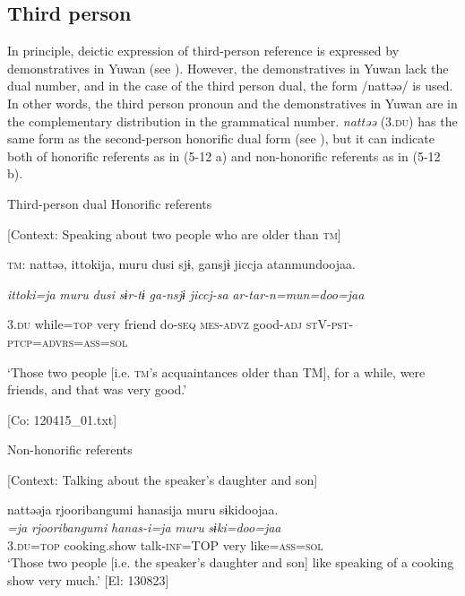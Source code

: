 \subsection{Third person}

In principle, deictic expression of third-person reference is expressed by demonstratives in Yuwan (see ). However, the demonstratives in Yuwan lack the dual number, and in the case of the third person dual, the form /nattəə/ is used. In other words, the third person pronoun and the demonstratives in Yuwan are in the complementary distribution in the grammatical number. \textit{nattəə} (3.\textsc{du}) has the same form as the second-person honorific dual form (see ), but it can indicate both of honorific referents as in (5-12 a) and non-honorific referents as in (5-12 b).

\ea \label{ex:5:12}   Third-person dual
  \ea Honorific referents

  [Context: Speaking about two people who are older than \textsc{tm}]

  \textsc{tm}:  nattəə,  {\textbar}ittoki{\textbar}ja,  muru  dusi  sjɨ,  gansjɨ  jiccja atanmundoojaa.
                                                                                                                            
    \textit{}  \textit{ittoki=ja}  \textit{muru}  \textit{dusi}  \textit{sɨr-tɨ}  \textit{ga-nsjɨ}  \textit{jiccj-sa} \textit{ar-tar-n=mun=doo=jaa}
                                                                                                                            
    3.\textsc{du}  while=\textsc{top}  very  friend  do-\textsc{seq}  \textsc{mes}-\textsc{advz}  good-\textsc{adj}  \textsc{st}V-\textsc{pst}-\textsc{ptcp}=\textsc{advrs}=\textsc{ass}=\textsc{sol}
    
    ‘Those two people [i.e. \textsc{tm}’s acquaintances older than TM], for a while, were friends, and that was very good.’

    [Co: 120415\_01.txt]

  \ex Non-honorific referents

  [Context: Talking about the speaker’s daughter and son]

\glll  nattəəja  {\textbar}rjooribangumi{\textbar}  hanasija  muru  sɨkidoojaa.\\
\textit{=ja}  \textit{rjooribangumi}  \textit{hanas-i=ja}  \textit{muru}  \textit{sɨki=doo=jaa}\\
3.\textsc{du}=\textsc{top}  cooking.show  talk-\textsc{inf}=TOP  very  like=\textsc{ass}=\textsc{sol}\\
\glt ‘Those two people [i.e. the speaker’s daughter and son] like speaking of a cooking show very much.’ [El: 130823]
\z
\z

